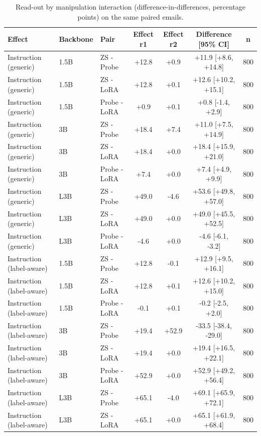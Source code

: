 \begin{table}[t]
\centering
\caption{Read-out by manipulation interaction (difference-in-differences, percentage points) on the same paired emails.}
\label{tab:did}
\footnotesize
\begin{tabular}{lllcccc}
\toprule
\textbf{Effect} & \textbf{Backbone} & \textbf{Pair} & \textbf{Effect r1} & \textbf{Effect r2} & \textbf{Difference [95\% CI]} & \textbf{n} \\
\midrule
Instruction (generic) & 1.5B & ZS - Probe & +12.8 & +0.9 & +11.9 [+8.6, +14.8] & 800 \\
Instruction (generic) & 1.5B & ZS - LoRA & +12.8 & +0.1 & +12.6 [+10.2, +15.1] & 800 \\
Instruction (generic) & 1.5B & Probe - LoRA & +0.9 & +0.1 & +0.8 [-1.4, +2.9] & 800 \\
Instruction (generic) & 3B & ZS - Probe & +18.4 & +7.4 & +11.0 [+7.5, +14.9] & 800 \\
Instruction (generic) & 3B & ZS - LoRA & +18.4 & +0.0 & +18.4 [+15.9, +21.0] & 800 \\
Instruction (generic) & 3B & Probe - LoRA & +7.4 & +0.0 & +7.4 [+4.9, +9.9] & 800 \\
Instruction (generic) & L3B & ZS - Probe & +49.0 & -4.6 & +53.6 [+49.8, +57.0] & 800 \\
Instruction (generic) & L3B & ZS - LoRA & +49.0 & +0.0 & +49.0 [+45.5, +52.5] & 800 \\
Instruction (generic) & L3B & Probe - LoRA & -4.6 & +0.0 & -4.6 [-6.1, -3.2] & 800 \\
Instruction (label-aware) & 1.5B & ZS - Probe & +12.8 & -0.1 & +12.9 [+9.5, +16.1] & 800 \\
Instruction (label-aware) & 1.5B & ZS - LoRA & +12.8 & +0.1 & +12.6 [+10.2, +15.0] & 800 \\
Instruction (label-aware) & 1.5B & Probe - LoRA & -0.1 & +0.1 & -0.2 [-2.5, +2.0] & 800 \\
Instruction (label-aware) & 3B & ZS - Probe & +19.4 & +52.9 & -33.5 [-38.4, -29.0] & 800 \\
Instruction (label-aware) & 3B & ZS - LoRA & +19.4 & +0.0 & +19.4 [+16.5, +22.1] & 800 \\
Instruction (label-aware) & 3B & Probe - LoRA & +52.9 & +0.0 & +52.9 [+49.2, +56.4] & 800 \\
Instruction (label-aware) & L3B & ZS - Probe & +65.1 & -4.0 & +69.1 [+65.9, +72.1] & 800 \\
Instruction (label-aware) & L3B & ZS - LoRA & +65.1 & +0.0 & +65.1 [+61.9, +68.4] & 800 \\

\end{tabular}
\end{table}
